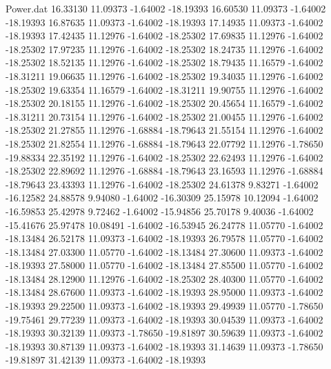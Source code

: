 \begin{filecontents}{Power.dat}
  16.33130   11.09373   -1.64002  -18.19393
  16.60530   11.09373   -1.64002  -18.19393
  16.87635   11.09373   -1.64002  -18.19393
  17.14935   11.09373   -1.64002  -18.19393
  17.42435   11.12976   -1.64002  -18.25302
  17.69835   11.12976   -1.64002  -18.25302
  17.97235   11.12976   -1.64002  -18.25302
  18.24735   11.12976   -1.64002  -18.25302
  18.52135   11.12976   -1.64002  -18.25302
  18.79435   11.16579   -1.64002  -18.31211
  19.06635   11.12976   -1.64002  -18.25302
  19.34035   11.12976   -1.64002  -18.25302
  19.63354   11.16579   -1.64002  -18.31211
  19.90755   11.12976   -1.64002  -18.25302
  20.18155   11.12976   -1.64002  -18.25302
  20.45654   11.16579   -1.64002  -18.31211
  20.73154   11.12976   -1.64002  -18.25302
  21.00455   11.12976   -1.64002  -18.25302
  21.27855   11.12976   -1.68884  -18.79643
  21.55154   11.12976   -1.64002  -18.25302
  21.82554   11.12976   -1.68884  -18.79643
  22.07792   11.12976   -1.78650  -19.88334
  22.35192   11.12976   -1.64002  -18.25302
  22.62493   11.12976   -1.64002  -18.25302
  22.89692   11.12976   -1.68884  -18.79643
  23.16593   11.12976   -1.68884  -18.79643
  23.43393   11.12976   -1.64002  -18.25302
  24.61378    9.83271   -1.64002  -16.12582
  24.88578    9.94080   -1.64002  -16.30309
  25.15978   10.12094   -1.64002  -16.59853
  25.42978    9.72462   -1.64002  -15.94856
  25.70178    9.40036   -1.64002  -15.41676
  25.97478   10.08491   -1.64002  -16.53945
  26.24778   11.05770   -1.64002  -18.13484
  26.52178   11.09373   -1.64002  -18.19393
  26.79578   11.05770   -1.64002  -18.13484
  27.03300   11.05770   -1.64002  -18.13484
  27.30600   11.09373   -1.64002  -18.19393
  27.58000   11.05770   -1.64002  -18.13484
  27.85500   11.05770   -1.64002  -18.13484
  28.12900   11.12976   -1.64002  -18.25302
  28.40300   11.05770   -1.64002  -18.13484
  28.67600   11.09373   -1.64002  -18.19393
  28.95000   11.09373   -1.64002  -18.19393
  29.22500   11.09373   -1.64002  -18.19393
  29.49939   11.05770   -1.78650  -19.75461
  29.77239   11.09373   -1.64002  -18.19393
  30.04539   11.09373   -1.64002  -18.19393
  30.32139   11.09373   -1.78650  -19.81897
  30.59639   11.09373   -1.64002  -18.19393
  30.87139   11.09373   -1.64002  -18.19393
  31.14639   11.09373   -1.78650  -19.81897
  31.42139   11.09373   -1.64002  -18.19393
\end{filecontents}
